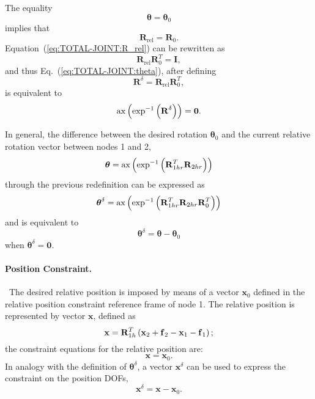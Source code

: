 \documentclass[10pt,dvips,fleqn,subeqn]{report}
\newcommand{\T}[1]{\bm{\mathbf{#1}}}
\newcommand{\dofs}{DOFs}
\begin{document}
The equality
\begin{equation}
	\T{\theta} = \T{\theta}_0
	\label{eq:TOTAL-JOINT:theta}
\end{equation}
implies that
\begin{equation}
	\T{R}_{\mathrm{rel}} = \T{R}_0 .
	\label{eq:TOTAL-JOINT:R_rel}
\end{equation}
Equation~(\ref{eq:TOTAL-JOINT:R_rel}) can be rewritten as
\begin{equation}
	\T{R}_{\mathrm{rel}} \T{R}_0^T = \T{I} ,
\end{equation}
and thus Eq.~(\ref{eq:TOTAL-JOINT:theta}),
after defining
\begin{equation}
	\T{R}^{\delta} = \T{R}_{\text{rel}} \T{R}_0^T ,
	\label{eq:TOTAL-JOINT:R^delta}
\end{equation}
is equivalent to
\begin{equation}
	\llk{ax}\plbr{\exp^{-1}\plbr{\T{R}^{\delta}}} = \T{0} .
\end{equation}

\noindent
In general, the difference between the desired rotation
$\T{\theta}_0$ and the current relative rotation vector between
nodes 1 and 2,
\begin{equation}
	\T{\theta} = \llk{ax}\plbr{\exp^{-1}\plbr{
		\T{R}_{1hr}^T \T{R}_{2hr}
	}}
\end{equation}
through the previous redefinition can be expressed as
\begin{equation}
	\T{\theta}^{\delta} = \llk{ax}\plbr{\exp^{-1}\plbr{
		\T{R}_{1hr}^T \T{R}_{2hr} \T{R}_0^T
	}}
	\label{eq:TOTAL-JOINT:thetadelta}
\end{equation}
and is equivalent to
\begin{equation}
	\T{\theta}^{\delta} = \T{\theta} - \T{\theta}_0
\end{equation}
when $\T{\theta}^{\delta}=\T{0}$.

\paragraph{Position Constraint.} \
The desired relative position is imposed by means of a vector $\T{x}_0$
defined in the relative position constraint reference frame of node 1.
The relative position is represented by vector $\T{x}$, defined as
\begin{equation}
	\T{x} = \T{R}_{1h}^T\plbr{
		\T{x}_2 + \T{f}_2 - \T{x}_1 - \T{f}_1
	} ;
\end{equation}
the constraint equations for the relative position are:
\begin{equation}
	\T{x} = \T{x}_0 .
\end{equation}
In analogy with the definition of $\T{\theta}^{\delta}$, a vector
$\T{x}^{\delta}$ can be used to express the constraint
on the position \dofs,
\begin{equation}
	\T{x}^{\delta} = \T{x} - \T{x}_0 .
\end{equation}
\end{document}
